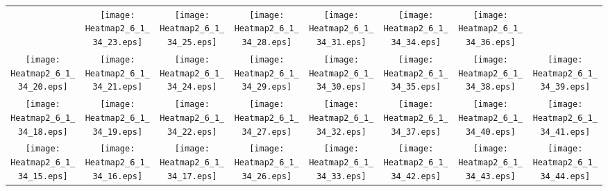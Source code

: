 \documentclass{standalone}
\begin{document}
\renewcommand{\arraystretch}{0}
\setlength{\tabcolsep}{0pt}
\begin{tabular}{ *8{c} }
 & \texttt{[image: Heatmap2\_6\_1\_34\_23.eps]} & \texttt{[image: Heatmap2\_6\_1\_34\_25.eps]} & \texttt{[image: Heatmap2\_6\_1\_34\_28.eps]} & \texttt{[image: Heatmap2\_6\_1\_34\_31.eps]} & \texttt{[image: Heatmap2\_6\_1\_34\_34.eps]} & \texttt{[image: Heatmap2\_6\_1\_34\_36.eps]} &  \\
\texttt{[image: Heatmap2\_6\_1\_34\_20.eps]} & \texttt{[image: Heatmap2\_6\_1\_34\_21.eps]} & \texttt{[image: Heatmap2\_6\_1\_34\_24.eps]} & \texttt{[image: Heatmap2\_6\_1\_34\_29.eps]} & \texttt{[image: Heatmap2\_6\_1\_34\_30.eps]} & \texttt{[image: Heatmap2\_6\_1\_34\_35.eps]} & \texttt{[image: Heatmap2\_6\_1\_34\_38.eps]} & \texttt{[image: Heatmap2\_6\_1\_34\_39.eps]} \\
\texttt{[image: Heatmap2\_6\_1\_34\_18.eps]} & \texttt{[image: Heatmap2\_6\_1\_34\_19.eps]} & \texttt{[image: Heatmap2\_6\_1\_34\_22.eps]} & \texttt{[image: Heatmap2\_6\_1\_34\_27.eps]} & \texttt{[image: Heatmap2\_6\_1\_34\_32.eps]} & \texttt{[image: Heatmap2\_6\_1\_34\_37.eps]} & \texttt{[image: Heatmap2\_6\_1\_34\_40.eps]} & \texttt{[image: Heatmap2\_6\_1\_34\_41.eps]} \\
\texttt{[image: Heatmap2\_6\_1\_34\_15.eps]} & \texttt{[image: Heatmap2\_6\_1\_34\_16.eps]} & \texttt{[image: Heatmap2\_6\_1\_34\_17.eps]} & \texttt{[image: Heatmap2\_6\_1\_34\_26.eps]} & \texttt{[image: Heatmap2\_6\_1\_34\_33.eps]} & \texttt{[image: Heatmap2\_6\_1\_34\_42.eps]} & \texttt{[image: Heatmap2\_6\_1\_34\_43.eps]} & \texttt{[image: Heatmap2\_6\_1\_34\_44.eps]} \\

\end{tabular}
\end{document}
